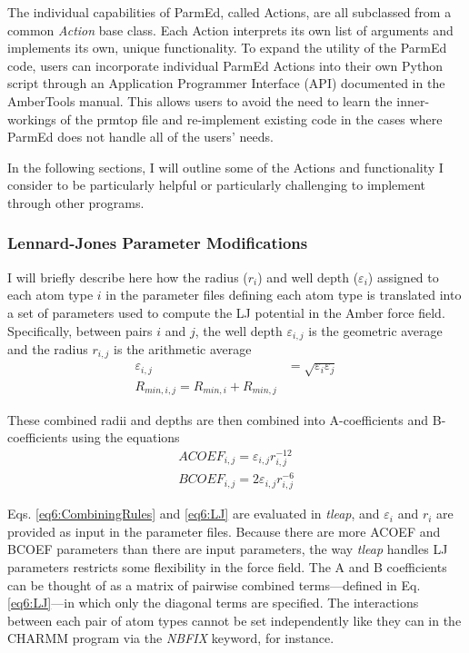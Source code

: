 The individual capabilities of ParmEd, called Actions, are all subclassed from a
common \emph{Action} base class. Each Action interprets its own list of
arguments and implements its own, unique functionality. To expand the utility of
the ParmEd code, users can incorporate individual ParmEd Actions into their own
Python script through an Application Programmer Interface (API) documented in
the AmberTools manual. This allows users to avoid the need to learn the
inner-workings of the prmtop file and re-implement existing code in the cases
where ParmEd does not handle all of the users' needs.

In the following sections, I will outline some of the Actions and functionality
I consider to be particularly helpful or particularly challenging to implement
through other programs.

\subsubsection{Lennard-Jones Parameter Modifications}

I will briefly describe here how the radius ($r_i$) and well depth
($\varepsilon_i$) assigned to each atom type $i$ in the parameter files defining
each atom type is translated into a set of parameters used to compute the LJ
potential in the Amber force field. Specifically, between pairs $i$ and $j$, the
well depth $\varepsilon_{i,j}$ is the geometric average and the radius $r_{i,j}$
is the arithmetic average
\begin{align}
   \varepsilon_{i,j} & = \sqrt{\varepsilon_i \varepsilon_j} \nonumber \\
   R_{min,i,j} = R_{min,i} + R_{min,j}
   \label{eq6:CombiningRules}
\end{align}

These combined radii and depths are then combined into A-coefficients and
B-coefficients using the equations
\begin{align}
   ACOEF_{i,j} = \varepsilon_{i,j}r_{i,j}^{-12} \nonumber \\
   BCOEF_{i,j} = 2 \varepsilon_{i,j}r_{i,j}^{-6}
   \label{eq6:LJ}
\end{align}

Eqs. \ref{eq6:CombiningRules} and \ref{eq6:LJ} are evaluated in \emph{tleap},
and $\varepsilon_i$ and $r_i$ are provided as input in the parameter files.
Because there are more ACOEF and BCOEF parameters than there are input
parameters, the way \emph{tleap} handles LJ parameters restricts some
flexibility in the force field. The A and B coefficients can be thought of as a
matrix of pairwise combined terms---defined in Eq. \ref{eq6:LJ}---in which only
the diagonal terms are specified. The interactions between each pair of atom
types cannot be set independently like they can in the CHARMM program via the
\emph{NBFIX} keyword, for instance.

